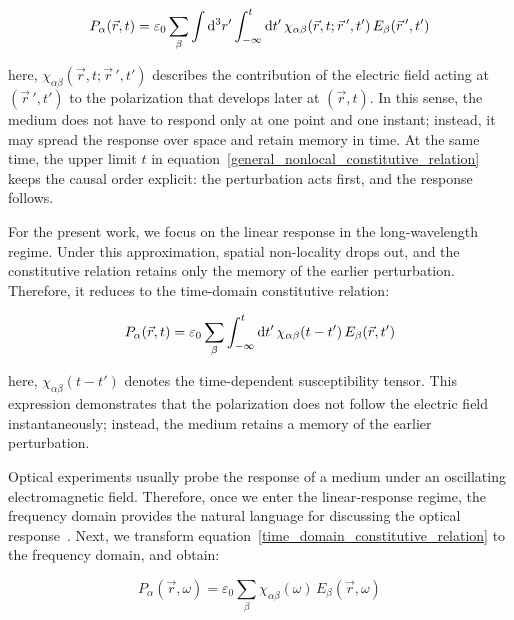 \begin{equation}
    P_\alpha(\vec{r},t) =
    \varepsilon_0\sum_\beta\int\mathrm{d}^3{r'}
    \int_{-\infty}^{t}\mathrm{d}{t'}
    \,\chi_{\alpha\beta}(\vec{r},t;\vec{r}\,',t')\,E_\beta(\vec{r}\,',t')
\label{general_nonlocal_constitutive_relation}
\end{equation}

here, $\chi_{\alpha\beta}(\vec{r},t;\vec{r}\,',t')$ describes the contribution of the electric field acting at $(\vec{r}\,',t')$ to the polarization that develops later at $(\vec{r},t)$.
In this sense, the medium does not have to respond only at one point and one instant;
instead, it may spread the response over space and retain memory in time.
At the same time, the upper limit $t$ in equation~\eqref{general_nonlocal_constitutive_relation} keeps the causal order explicit: the perturbation acts first, and the response follows.

For the present work, we focus on the linear response in the long-wavelength regime.
Under this approximation, spatial non-locality drops out, and the constitutive relation retains only the memory of the earlier perturbation.
Therefore, it reduces to the time-domain constitutive relation:

\begin{equation}
    P_\alpha(\vec{r},t)=
    \varepsilon_0\sum_\beta\int_{-\infty}^{t}\mathrm{d}{t'}\,\chi_{\alpha\beta}(t-t')\,E_\beta(\vec{r},t')
\label{time_domain_constitutive_relation}
\end{equation}

here, $\chi_{\alpha\beta}(t-t')$ denotes the time-dependent susceptibility tensor.
This expression demonstrates that the polarization does not follow the electric field instantaneously;
instead, the medium retains a memory of the earlier perturbation.

Optical experiments usually probe the response of a medium under an oscillating electromagnetic field.
Therefore, once we enter the linear-response regime, the frequency domain provides the natural language for discussing the optical response~\cite{han2023temperature}.
Next, we transform equation~\eqref{time_domain_constitutive_relation} to the frequency domain, and obtain:

\begin{equation}
    P_\alpha(\vec{r},\omega)=\varepsilon_0\sum_\beta\chi_{\alpha\beta}(\omega)\,E_\beta(\vec{r},\omega)
\label{frequency_domain_polarization_susceptibility_relation}
\end{equation}

